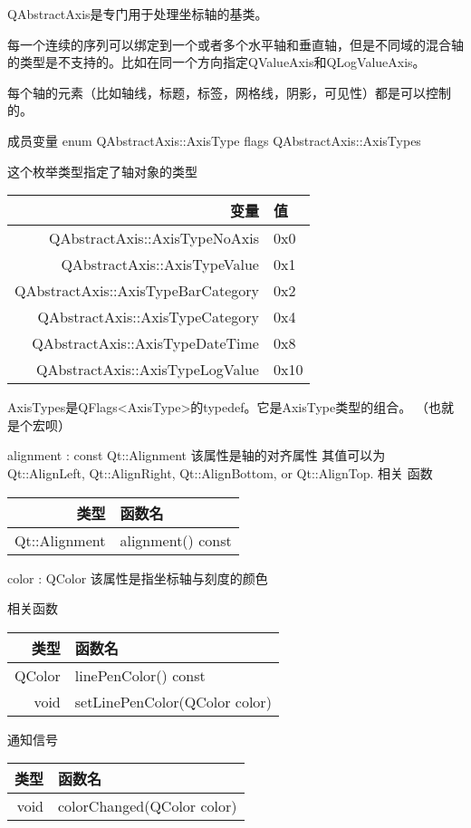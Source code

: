 QAbstractAxis是专门用于处理坐标轴的基类。

每一个连续的序列可以绑定到一个或者多个水平轴和垂直轴，但是不同域的混合轴的类型是不支持的。比如在同一个方向指定QValueAxis和QLogValueAxis。

每个轴的元素（比如轴线，标题，标签，网格线，阴影，可见性）都是可以控制的。

成员变量
enum QAbstractAxis::AxisType flags QAbstractAxis::AxisTypes

这个枚举类型指定了轴对象的类型

\begin{tabular}{|r|l|}
\hline
变量&值\\
\hline
QAbstractAxis::AxisTypeNoAxis&	0x0\\
\hline
QAbstractAxis::AxisTypeValue&	0x1\\
\hline
QAbstractAxis::AxisTypeBarCategory&	0x2\\
\hline
QAbstractAxis::AxisTypeCategory&	0x4\\
\hline
QAbstractAxis::AxisTypeDateTime&	0x8\\
\hline
QAbstractAxis::AxisTypeLogValue&	0x10\\
\hline
\end{tabular}

AxisTypes是QFlags<AxisType>的typedef。它是AxisType类型的组合。 （也就是个宏呗）

alignment : const Qt::Alignment 该属性是轴的对齐属性 其值可以为
Qt::AlignLeft, Qt::AlignRight, Qt::AlignBottom, or Qt::AlignTop. 相关
函数

\begin{tabular}{|r|l|}
\hline
类型&函数名\\
\hline
Qt::Alignment&	alignment() const\\
\hline
\end{tabular}

\splitLine

color : QColor 该属性是指坐标轴与刻度的颜色

相关函数

\begin{tabular}{|r|l|}
\hline
类型 & 函数名\\
\hline
QColor&	linePenColor() const\\
\hline
void&	setLinePenColor(QColor color)\\
\hline
\end{tabular}

通知信号

\begin{tabular}{|r|l|}
\hline
类型&函数名\\ 
\hline
void	&colorChanged(QColor color)\\
\hline
\end{tabular}

